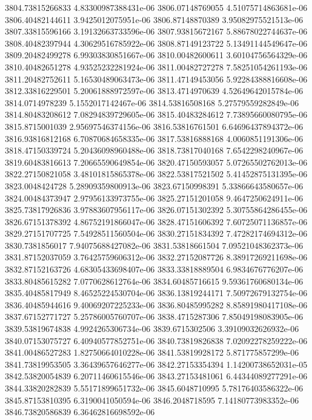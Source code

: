 {3804.73815266833 4.83300987388431e-06
3806.07148769055 4.51075714863681e-06
3806.40482144611 3.9425012075951e-06
3806.87148870389 3.95082975521513e-06
3807.33815596166 3.19132663733596e-06
3807.93815672167 5.88678022744637e-06
3808.40482397944 4.30629516785922e-06
3808.87149123722 5.13491144549647e-06
3809.20482499278 6.99303830851667e-06
3810.00482600611 3.60104756564329e-06
3810.40482651278 4.93525232281924e-06
3811.00482727278 7.58251054261193e-06
3811.20482752611 5.16530489063473e-06
3811.47149453056 5.92284388816608e-06
3812.33816229501 5.20061888972597e-06
3813.4714970639 4.52649642015784e-06
3814.0714978239 5.1552017142467e-06
3814.53816508168 5.27579559282849e-06
3814.80483208612 7.08294839729605e-06
3815.40483284612 7.73895660080795e-06
3815.8715001039 2.95697546374156e-06
3816.53816761501 6.64696437894372e-06
3816.93816812168 6.70870684658335e-06
3817.53816888168 4.0060851191306e-06
3818.47150339724 5.20436098960488e-06
3818.73817040168 7.6542298240967e-06
3819.60483816613 7.20665590649854e-06
3820.47150593057 5.07265502762013e-06
3822.27150821058 3.48101815865378e-06
3822.53817521502 5.41452875131395e-06
3823.0048424728 5.28909359800913e-06
3823.67150998391 5.33866643580657e-06
3824.00484373947 2.97956133973755e-06
3825.27151201058 9.4647250624911e-06
3825.73817926836 3.97883607956117e-06
3826.07151302392 5.30755864286455e-06
3826.67151378392 4.86752191866047e-06
3828.47151606392 7.60725071136857e-06
3829.27151707725 7.54928511560504e-06
3830.27151834392 7.47282174694312e-06
3830.7381856017 7.94075688427082e-06
3831.53818661504 7.09521048362373e-06
3831.87152037059 3.76425759606312e-06
3832.27152087726 8.38917269211698e-06
3832.87152163726 4.68305433698407e-06
3833.33818889504 6.9834676776207e-06
3833.80485615282 7.0770628612764e-06
3834.60485716615 9.59361760680134e-06
3835.40485817949 8.46525224530704e-06
3836.13819244171 7.50972679132754e-06
3836.40485944616 9.40069207225233e-06
3836.80485995282 8.85891980417108e-06
3837.67152771727 5.25786005760707e-06
3838.4715287306 7.85049198083905e-06
3839.53819674838 4.9924265306734e-06
3839.6715302506 3.39109032626932e-06
3840.07153075727 6.40940577852751e-06
3840.73819826838 7.02092278259222e-06
3841.00486527283 1.82750664010228e-06
3841.53819928172 5.871775857299e-06
3841.73819953505 3.36439657646277e-06
3842.27153354394 1.14200738652031e-05
3842.53820054839 6.20711460615546e-06
3843.27153481061 6.44344089277291e-06
3844.33820282839 5.55171899651732e-06
3845.6048710995 5.78176403586322e-06
3845.87153810395 6.3190041050594e-06
3846.2048718595 7.14180773983352e-06
3846.73820586839 6.36462816698592e-06
}
